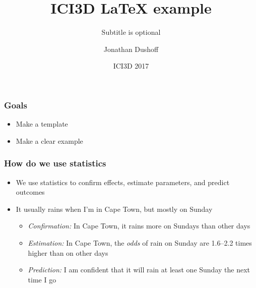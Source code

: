 \documentclass{beamer}
\begin{document}
\title{ICI3D LaTeX example}
\subtitle{Subtitle is optional} %
\author{Jonathan Dushoff}
\date{ICI3D 2017} %
\newcommand{\years}{2017} %
\newcommand{\figshare}{https://figshare.com/articles/NAME/NUMBER}



\begin{frame}

\frametitle{Goals}

\begin{itemize}

\item Make a template

\item Make a clear example

\end{itemize}

\end{frame}
\begin{frame}

\frametitle{How do we use statistics}

\begin{itemize}

	\item We use statistics to confirm effects, estimate parameters, and
		predict outcomes

	\item It usually rains when I'm in Cape Town, but mostly on Sunday

	\begin{itemize}

		\item \emph{Confirmation:} In Cape Town, it rains more on Sundays than
				other days

		\item \emph{Estimation:} In Cape Town, the \emph{odds} of rain on
				Sunday are 1.6--2.2 times higher than on other days

		\item \emph{Prediction:} I am confident that it will rain at least one
				Sunday the next time I go

	\end{itemize}

\end{itemize}

\end{frame}
\end{document}
